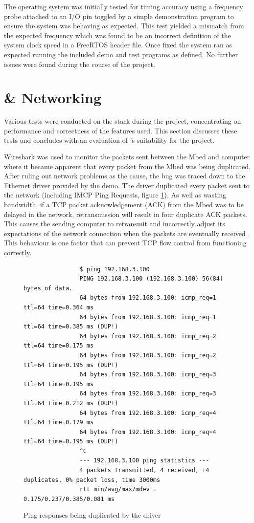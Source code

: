 		The operating system was initially tested for timing accuracy using a
		frequency probe attached to an I/O pin toggled by a simple demonstration
		program to ensure the system was behaving as expected. This test yielded a
		mismatch from the expected frequency which was found to be an incorrect
		definition of the system clock speed in a FreeRTOS header file. Once fixed
		the system ran as expected running the included demo and test programs as
		defined. No further issues were found during the course of the project.
	
	\section{\uIP{} \& Networking}
		
		Various tests were conducted on the \uIP{} stack during the project,
		concentrating on performance and correctness of the features used. This
		section discusses these tests and concludes with an evaluation of \uIP{}'s
		suitability for the project.
		
		\label{sec:udpPerformance}
		
		Wireshark was used to monitor the packets sent between the Mbed and computer
		where it became apparent that every packet from the Mbed was being
		duplicated. After ruling out network problems as the cause, the bug was
		traced down to the Ethernet driver provided by the demo. The driver
		duplicated every packet sent to the network (including IMCP Ping Requests,
		figure \ref{fig:ping}). As well as wasting bandwidth, if a TCP packet
		acknowledgement (ACK) from the Mbed was to be delayed in the network,
		retransmission will result in four duplicate ACK packets. This causes the
		sending computer to retransmit and incorrectly adjust its expectations of
		the network connection when the packets are eventually received
		\cite{duplicateack}. This behaviour is one factor that can prevent TCP flow
		control from functioning correctly.
		
		\begin{figure}
			\begin{verbatim}
				$ ping 192.168.3.100
				PING 192.168.3.100 (192.168.3.100) 56(84) bytes of data.
				64 bytes from 192.168.3.100: icmp_req=1 ttl=64 time=0.364 ms
				64 bytes from 192.168.3.100: icmp_req=1 ttl=64 time=0.385 ms (DUP!)
				64 bytes from 192.168.3.100: icmp_req=2 ttl=64 time=0.175 ms
				64 bytes from 192.168.3.100: icmp_req=2 ttl=64 time=0.195 ms (DUP!)
				64 bytes from 192.168.3.100: icmp_req=3 ttl=64 time=0.195 ms
				64 bytes from 192.168.3.100: icmp_req=3 ttl=64 time=0.212 ms (DUP!)
				64 bytes from 192.168.3.100: icmp_req=4 ttl=64 time=0.179 ms
				64 bytes from 192.168.3.100: icmp_req=4 ttl=64 time=0.195 ms (DUP!)
				^C
				--- 192.168.3.100 ping statistics ---
				4 packets transmitted, 4 received, +4 duplicates, 0% packet loss, time 3000ms
				rtt min/avg/max/mdev = 0.175/0.237/0.385/0.081 ms
			\end{verbatim}
			\caption{Ping responses being duplicated by the \uIP{} driver}
			\label{fig:ping}
		\end{figure}
		
